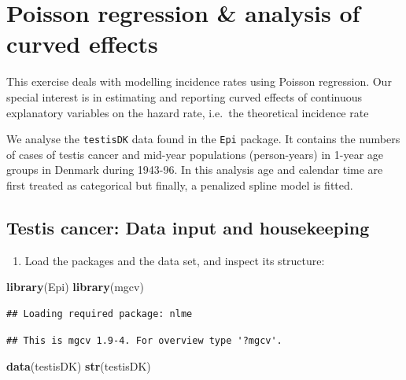 \documentclass[
]{book}
\newenvironment{Shaded}{\begin{snugshade}}{\end{snugshade}}
\newcommand{\FunctionTok}[1]{\textcolor[rgb]{0.13,0.29,0.53}{\textbf{#1}}}
\newcommand{\NormalTok}[1]{#1}
\providecommand{\tightlist}{%
  \setlength{\itemsep}{0pt}\setlength{\parskip}{0pt}}
\begin{document}
\chapter{Poisson regression \& analysis of curved effects}\label{poisson-regression-analysis-of-curved-effects}

This exercise deals with modelling incidence rates
using Poisson regression. Our special interest is in
estimating and reporting curved effects of continuous
explanatory variables on the hazard rate, i.e.~the theoretical incidence rate

We analyse the \texttt{testisDK} data found in the
\texttt{Epi} package.
It contains the numbers of cases of testis cancer and mid-year
populations (person-years) in 1-year age groups in Denmark during
1943-96. In this analysis age and calendar time
are first treated as categorical
but finally, a penalized spline model is fitted.

\section{Testis cancer: Data input and housekeeping}\label{testis-cancer-data-input-and-housekeeping}

\begin{enumerate}
\def\labelenumi{\arabic{enumi}.}
\tightlist
\item
  Load the packages and the data set, and inspect its structure:
\end{enumerate}

\begin{Shaded}
\begin{Highlighting}[]
\FunctionTok{library}\NormalTok{(Epi)}
\FunctionTok{library}\NormalTok{(mgcv)}
\end{Highlighting}
\end{Shaded}

\begin{verbatim}
## Loading required package: nlme
\end{verbatim}

\begin{verbatim}
## This is mgcv 1.9-4. For overview type '?mgcv'.
\end{verbatim}

\begin{Shaded}
\begin{Highlighting}[]
\FunctionTok{data}\NormalTok{(testisDK)}
\FunctionTok{str}\NormalTok{(testisDK)}
\end{Highlighting}
\end{Shaded}
\end{document}
